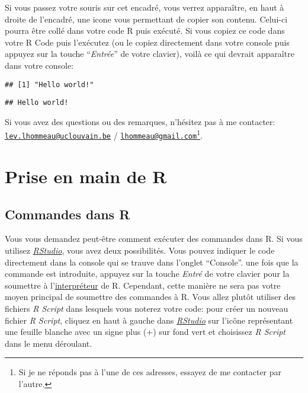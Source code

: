 \documentclass[
]{book}
\begin{document}
Si vous passez votre souris sur cet encadré, vous verrez apparaître, en haut à droite de l'encadré, une icone vous permettant de copier son contenu. Celui-ci pourra être collé dans votre code R puis exécuté. Si vous copiez ce code dans votre R Code puis l'exécutez (ou le copiez directement dans votre console puis appuyez sur la touche ``\emph{Entrée}'' de votre clavier), voilà ce qui devrait apparaître dans votre console:

\begin{verbatim}
## [1] "Hello world!"
\end{verbatim}

\begin{verbatim}
## Hello world!
\end{verbatim}

Si vous avez des questions ou des remarques, n'hésitez pas à me contacter: \href{mailto:lev.lhommeau@uclouvain.be}{\nolinkurl{lev.lhommeau@uclouvain.be}} / \href{mailto:lhommeau@gmail.com}{\nolinkurl{lhommeau@gmail.com}}\footnote{Si je ne réponds pas à l'une de ces adresses, essayez de me contacter par l'autre.}.

\hypertarget{Priseenmain}{%
\chapter{Prise en main de R}\label{Priseenmain}}

\hypertarget{Commandes}{%
\section{Commandes dans R}\label{Commandes}}

Vous vous demandez peut-être comment exécuter des commandes dans R. Si vous utilisez \href{https://posit.co/}{\emph{RStudio}}, vous avez deux possibilités. Vous pouvez indiquer le code directement dans la console qui se trauve dans l'onglet ``Console''. une fois que la commande est introduite, appuyez sur la touche \emph{Entré} de votre clavier pour la soumettre à l'\href{https://fr.wikipedia.org/wiki/Interpr\%C3\%A8te_(informatique)}{interpréteur} de R. Cependant, cette manière ne sera pas votre moyen principal de soumettre des commandes à R. Vous allez plutôt utiliser des fichiers \emph{R Script} dans lesquels vous noterez votre code: pour créer un nouveau fichier \emph{R Script}, cliquez en haut à gauche dans \href{https://posit.co/}{\emph{RStudio}} sur l'icône représentant une feuille blanche avec un signe plus (+) sur fond vert et choisissez \emph{R Script} dans le menu déroulant.
\end{document}
